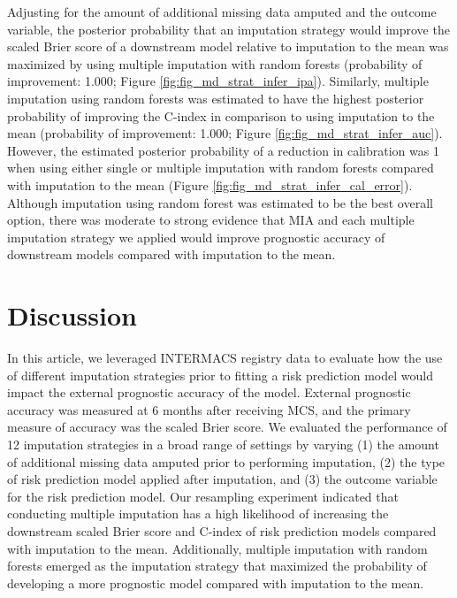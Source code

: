 \documentclass{article}
\begin{document}
Adjusting for the amount of additional missing data amputed and the
outcome variable, the posterior probability that an imputation strategy
would improve the scaled Brier score of a downstream model relative to
imputation to the mean was maximized by using multiple imputation with
random forests (probability of improvement: 1.000; Figure
\ref{fig:fig_md_strat_infer_ipa}). Similarly, multiple imputation using
random forests was estimated to have the highest posterior probability
of improving the C-index in comparison to using imputation to the mean
(probability of improvement: 1.000; Figure
\ref{fig:fig_md_strat_infer_auc}). However, the estimated posterior
probability of a reduction in calibration was 1 when using either single
or multiple imputation with random forests compared with imputation to
the mean (Figure \ref{fig:fig_md_strat_infer_cal_error}). Although
imputation using random forest was estimated to be the best overall
option, there was moderate to strong evidence that MIA and each multiple
imputation strategy we applied would improve prognostic accuracy of
downstream models compared with imputation to the mean.

\hypertarget{discussion}{%
\section{Discussion}\label{discussion}}

In this article, we leveraged INTERMACS registry data to evaluate how
the use of different imputation strategies prior to fitting a risk
prediction model would impact the external prognostic accuracy of the
model. External prognostic accuracy was measured at 6 months after
receiving MCS, and the primary measure of accuracy was the scaled Brier
score. We evaluated the performance of 12 imputation strategies in a
broad range of settings by varying (1) the amount of additional missing
data amputed prior to performing imputation, (2) the type of risk
prediction model applied after imputation, and (3) the outcome variable
for the risk prediction model. Our resampling experiment indicated that
conducting multiple imputation has a high likelihood of increasing the
downstream scaled Brier score and C-index of risk prediction models
compared with imputation to the mean. Additionally, multiple imputation
with random forests emerged as the imputation strategy that maximized
the probability of developing a more prognostic model compared with
imputation to the mean.
\end{document}
